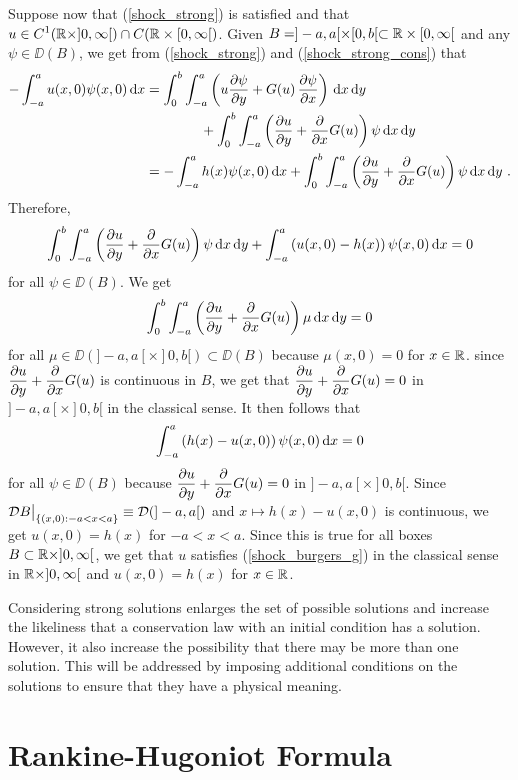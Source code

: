 Suppose now that (\ref{shock_strong}) is satisfied
and that $\DS u \in C^1(\RR \times ]0,\infty[)
\cap C(\RR \times [0,\infty[)$.
Given $B = ]-a,a[ \times [0,b[ \subset \RR \times [0,\infty[$
and any $\psi \in \DD(B)$, we get from
(\ref{shock_strong}) and (\ref{shock_strong_cons}) that
\begin{align*}
-\int_{-a}^a u(x,0)\psi(x,0) \dx{x}
&= \int_0^b \int_{-a}^a
\left( u \pdydx{\psi}{y} + G(u)\,\pdydx{\psi}{x}
\right) \dx{x}\dx{y} \\
& \qquad \qquad+ \int_0^b \int_{-a}^a
\left( \pdydx{u}{y} + \pdfdx{G(u)}{x}\right) \psi \dx{x}\dx{y} \\
&= - \int_{-a}^a h(x)\psi(x,0) \dx{x} 
+ \int_0^b \int_{-a}^a
 \left( \pdydx{u}{y} + \pdfdx{G(u)}{x}\right) \psi \dx{x}\dx{y} \ .
\end{align*}
Therefore,
\[
\int_0^b \int_{-a}^a
\left( \pdydx{u}{y} + \pdfdx{G(u)}{x}\right) \psi \dx{x}\dx{y} 
+ \int_{-a}^a \left( u(x,0) - h(x) \right) \psi(x,0) \dx{x} = 0
\]
for all $\psi \in \DD(B)$.  We get
\[
\int_0^b \int_{-a}^a \left(\pdydx{u}{y} + \pdfdx{G(u)}{x} \right)
\mu \dx{x}\dx{y}  = 0
\]
for all $\mu \in \DD(]-a,a[\times ]0,b[) \subset \DD(B)$ because
$\mu(x,0) = 0$ for $x\in \RR$.  since
$\DS \pdydx{u}{y} + \pdfdx{G(u)}{x}$ is
continuous in $B$, we get that
$\DS \pdydx{u}{y} + \pdfdx{G(u)}{x} = 0$ in
$]-a,a[\times]0,b[$ in the classical sense. 
It then follows that
\[
\int_{-a}^a \left( h(x) - u(x,0) \right) \psi(x,0) \dx{x} = 0
\]
for all $\psi \in \DD(B)$ because
$\DS \pdydx{u}{y} + \pdfdx{G(u)}{x} = 0$ in $]-a,a[\times ]0,b[$.
Since $\DS \DD{B}\big|_{\{(x,0):-a < x <a\}} \equiv \DD(]-a,a[)$
and $x\mapsto h(x) - u(x,0)$ is continuous, we get
$u(x,0) = h(x)$ for $-a < x < a$.  Since this is true for all boxes
$B \subset \RR\times ]0,\infty[$, we get that $u$
satisfies (\ref{shock_burgers_g}) in the classical
sense in $\RR \times ]0,\infty[$ and $u(x,0) = h(x)$ for $x \in \RR$.

Considering strong solutions enlarges the set of possible solutions
and increase the likeliness that a conservation law with an initial
condition has a solution.  However, it also increase the possibility
that there may be more than one solution.  This will be addressed by
imposing additional conditions on the solutions to ensure that they
have a physical meaning.

\section{Rankine-Hugoniot Formula} \label{sectRankHugo}

